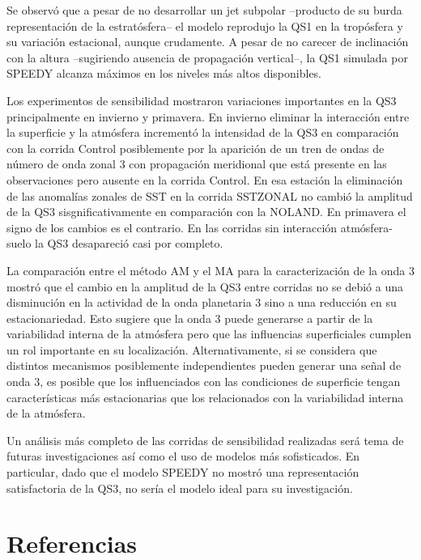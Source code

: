 \documentclass[spanish,a4paper,12pt,oneside]{book}
\begin{document}
Se observó que a pesar de no desarrollar un jet subpolar --producto de
su burda representación de la estratósfera-- el modelo reprodujo la QS1
en la tropósfera y su variación estacional, aunque crudamente. A pesar
de no carecer de inclinación con la altura --sugiriendo ausencia de
propagación vertical--, la QS1 simulada por SPEEDY alcanza máximos en
los niveles más altos disponibles.

Los experimentos de sensibilidad mostraron variaciones importantes en la
QS3 principalmente en invierno y primavera. En invierno eliminar la
interacción entre la superficie y la atmósfera incrementó la intensidad
de la QS3 en comparación con la corrida Control posiblemente por la
aparición de un tren de ondas de número de onda zonal 3 con propagación
meridional que está presente en las observaciones pero ausente en la
corrida Control. En esa estación la eliminación de las anomalías zonales
de SST en la corrida SSTZONAL no cambió la amplitud de la QS3
sisgnificativamente en comparación con la NOLAND. En primavera el signo
de los cambios es el contrario. En las corridas sin interacción
atmósfera-suelo la QS3 desapareció casi por completo.

La comparación entre el método AM y el MA para la caracterización de la
onda 3 mostró que el cambio en la amplitud de la QS3 entre corridas no
se debió a una disminución en la actividad de la onda planetaria 3 sino
a una reducción en su estacionariedad. Esto sugiere que la onda 3 puede
generarse a partir de la variabilidad interna de la atmósfera pero que
las influencias superficiales cumplen un rol importante en su
localización. Alternativamente, si se considera que distintos mecanismos
posiblemente independientes pueden generar una señal de onda 3, es
posible que los influenciados con las condiciones de superficie tengan
características más estacionarias que los relacionados con la
variabilidad interna de la atmósfera.

Un análisis más completo de las corridas de sensibilidad realizadas será
tema de futuras investigaciones así como el uso de modelos más
sofisticados. En particular, dado que el modelo SPEEDY no mostró una
representación satisfactoria de la QS3, no sería el modelo ideal para su
investigación.

\chapter*{Referencias}\label{referencias}
\end{document}
